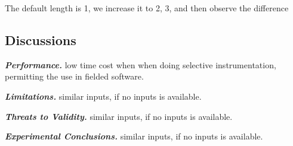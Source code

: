 The default length is 1, we increase it to 2, 3, and then observe the difference

\subsection{Discussions}

\noindent \textbf{\textit{Performance.}} low time cost when when doing
selective instrumentation, permitting the use in fielded software.

\vspace{1mm}

\noindent \textbf{\textit{Limitations.}} similar inputs, if no inputs is available.

\vspace{1mm}

\noindent \textbf{\textit{Threats to Validity.}} similar inputs, if no inputs is available.

\vspace{1mm}

\noindent \textbf{\textit{Experimental Conclusions.}} similar inputs, if no inputs is available.

